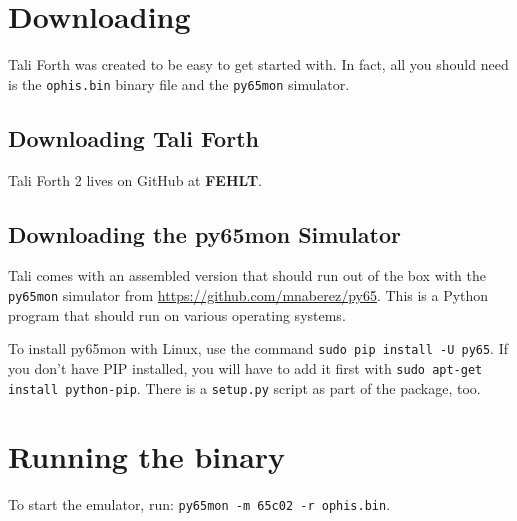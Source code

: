 \section{Downloading}

Tali Forth was created to be easy to get started with. In fact, all you should
need is the \texttt{ophis.bin} binary file and the
\texttt{py65mon} simulator.

\subsection{Downloading Tali Forth}

Tali Forth 2 lives on GitHub at \textbf{FEHLT}.

\subsection{Downloading the py65mon Simulator}

Tali comes with an assembled version that should run out of the box with the
\texttt{py65mon} simulator from
\href{https://github.com/mnaberez/py65}{https://github.com/mnaberez/py65}. This
is a Python program that should run on various operating systems. 

To install py65mon with Linux, use the command \texttt{sudo pip
install -U py65}. If you don't have PIP installed, you will have to
add it first with \texttt{sudo apt-get install python-pip}.  There is a
\texttt{setup.py} script as part of the package, too. 

\section{Running the binary}

To start the emulator, run: \texttt{py65mon -m 65c02 -r ophis.bin}.

